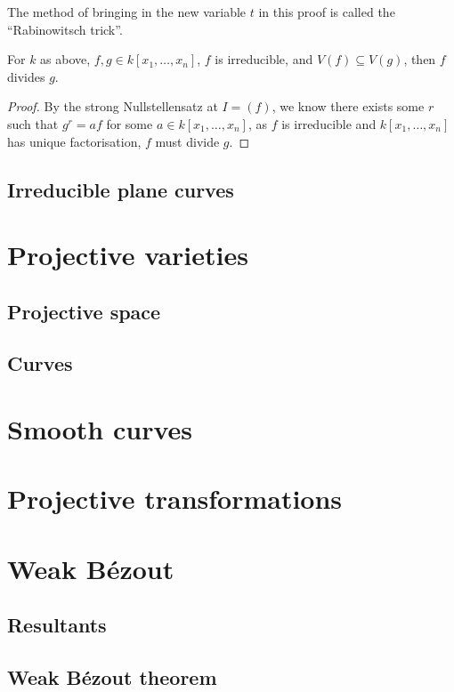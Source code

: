 \documentclass{article}
\begin{document}
The method of bringing in the new variable $t$ in this proof is called the ``Rabinowitsch trick''.

\begin{corollary}
    For $k$ as above, $f,g\in k[x_1,\ldots,x_n]$, $f$ is irreducible, and $V(f)\subseteq V(g)$, then $f$ divides $g$.
    \begin{proof}
        By the strong Nullstellensatz at $I=(f)$, we know there exists some $r$ such that $g^r = af$ for some $a\in k[x_1,\ldots,x_n]$, as $f$ is irreducible and $k[x_1,\ldots,x_n]$ has unique factorisation, $f$ must divide $g$.
    \end{proof}
\end{corollary}

\subsection{Irreducible plane curves}

\section{Projective varieties}

\subsection{Projective space}

\subsection{Curves}

\section{Smooth curves}

\section{Projective transformations}

\section{Weak B\'ezout}

\subsection{Resultants}

\subsection{Weak B\'ezout theorem}
\end{document}
